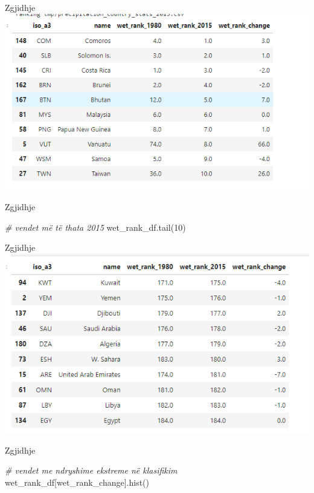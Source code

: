 \documentclass[
  ignorenonframetext,
]{beamer}
\newenvironment{Shaded}{\begin{snugshade}}{\end{snugshade}}
\newcommand{\CommentTok}[1]{\textcolor[rgb]{0.56,0.35,0.01}{\textit{#1}}}
\newcommand{\DecValTok}[1]{\textcolor[rgb]{0.00,0.00,0.81}{#1}}
\newcommand{\NormalTok}[1]{#1}
\newcommand{\StringTok}[1]{\textcolor[rgb]{0.31,0.60,0.02}{#1}}
\begin{document}
\begin{frame}{Zgjidhje}
\protect\hypertarget{zgjidhje-11}{}
\includegraphics{./Figs/usht4.png}
\end{frame}

\begin{frame}[fragile]{Zgjidhje}
\protect\hypertarget{zgjidhje-12}{}

\begin{Shaded}
\begin{Highlighting}[]
\CommentTok{\# vendet më të thata 2015}
\NormalTok{wet\_rank\_df.tail(}\DecValTok{10}\NormalTok{)}
\end{Highlighting}
\end{Shaded}
\end{frame}

\begin{frame}{Zgjidhje}
\protect\hypertarget{zgjidhje-13}{}
\includegraphics{./Figs/usht41.png}
\end{frame}

\begin{frame}[fragile]{Zgjidhje}
\protect\hypertarget{zgjidhje-14}{}

\begin{Shaded}
\begin{Highlighting}[]
\CommentTok{\# vendet me ndryshime ekstreme në klasifikim}
\NormalTok{wet\_rank\_df[}\StringTok{\textquotesingle{}wet\_rank\_change\textquotesingle{}}\NormalTok{].hist()}
\end{Highlighting}
\end{Shaded}
\end{frame}
\end{document}
